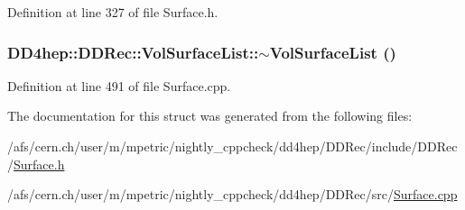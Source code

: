 Definition at line 327 of file Surface.h.\hypertarget{struct_d_d4hep_1_1_d_d_rec_1_1_vol_surface_list_a7729277c83e494f147f21166220debd0}{
\subsubsection[{$\sim$VolSurfaceList}]{\setlength{\rightskip}{0pt plus 5cm}DD4hep::DDRec::VolSurfaceList::$\sim$VolSurfaceList ()}}
\label{struct_d_d4hep_1_1_d_d_rec_1_1_vol_surface_list_a7729277c83e494f147f21166220debd0}


Definition at line 491 of file Surface.cpp.

The documentation for this struct was generated from the following files:\begin{DoxyCompactItemize}
\item 
/afs/cern.ch/user/m/mpetric/nightly\_\-cppcheck/dd4hep/DDRec/include/DDRec/\hyperlink{_surface_8h}{Surface.h}\item 
/afs/cern.ch/user/m/mpetric/nightly\_\-cppcheck/dd4hep/DDRec/src/\hyperlink{_surface_8cpp}{Surface.cpp}\end{DoxyCompactItemize}
